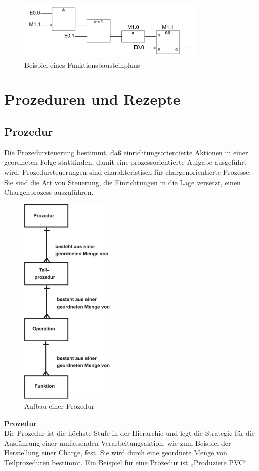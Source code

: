	\begin{figure}[h!]
  		\centering
    	\includegraphics[width=0.8\textwidth]{graphics/stateoftheart/funktionsbausteinplan_Selfmade.png}
  		\caption{Beispiel eines Funktionsbausteinplans \cite{funktionsbausteinplan}}
	\end{figure}

\section{Prozeduren und Rezepte}
\subsection{Prozedur}
Die Prozedursteuerung bestimmt, daß einrichtungsorientierte Aktionen in einer geordneten Folge stattfinden, damit eine prozessorientierte Aufgabe ausgeführt wird. Prozedursteuerungen sind charakteristisch für chargenorientierte Prozesse. Sie sind die Art von Steuerung, die Einrichtungen in die Lage versetzt, einen Chargenprozess auszuführen.\\

\begin{figure}[h!]
		\centering
		\includegraphics[width=0.4\textwidth]{graphics/stateoftheart/prozedursteuerung.png}
		\caption{Aufbau einer Prozedur}
\end{figure}
\newpage
\textbf{Prozedur}\\
Die Prozedur ist die höchste Stufe in der Hierarchie und legt die Strategie für die Ausführung einer umfassenden Verarbeitungsaktion, wie zum Beispiel der Herstellung einer Charge, fest. Sie wird durch eine geordnete Menge von Teilprozeduren bestimmt. Ein Beispiel für eine Prozedur ist „Produziere PVC“.\\

